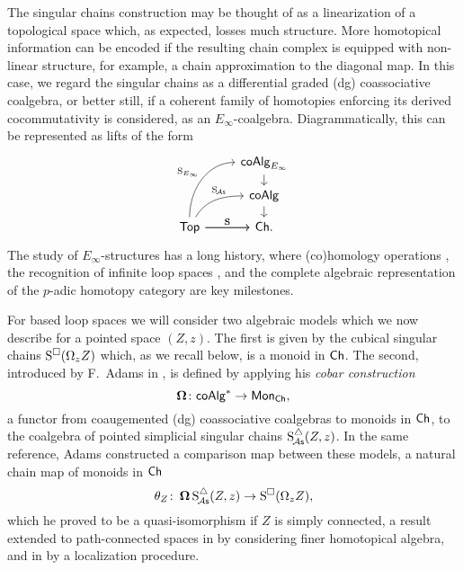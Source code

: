 The singular chains construction may be thought of as a linearization of a topological space which, as expected, losses much structure.
More homotopical information can be encoded if the resulting chain complex is equipped with non-linear structure, for example, a chain approximation to the diagonal map.
In this case, we regard the singular chains as a differential graded (dg) coassociative coalgebra, or better still, if a coherent family of homotopies enforcing its derived cocommutativity is considered, as an $E_\infty$-coalgebra.
Diagrammatically, this can be represented as lifts of the form
\begin{equation}
	\begin{tikzcd}[column sep=normal, row sep=small]
		& \coAlg_{E_\infty} \arrow[d] \\
		& \coAlg \arrow[d] \\
		\Top \arrow[uur, "\Schains_{E_\infty}", out=90, in=180] \arrow[r, "\Schains"]
		\arrow[ur, "\SchainsA", out=60, in=180, near end]
		\arrow[r, "\Schains"]
		& \Ch.
	\end{tikzcd}
\end{equation}
The study of $E_\infty$-structures has a long history, where (co)homology operations \cite{steenrod1962cohomology, may1970general}, the recognition of infinite loop spaces \cite{boardman1973homotopy, may1972geometry}, and the complete algebraic representation of the $p$-adic homotopy category \cite{mandell2001padic} are key milestones.

For based loop spaces we will consider two algebraic models which we now describe for a pointed space $(Z, z)$.
The first is given by the cubical singular chains $\operatorname{S^{\square}}(\Omega_z Z)$ which, as we recall below, is a monoid in $\mathsf{Ch}$.
The second, introduced by F.~Adams in \cite{adams1956cobar}, is defined by applying his \textit{cobar construction}
\[
\operatorname{\mathbf{\Omega}} \colon \mathsf{coAlg}^\ast \to \mathsf{Mon}_{\mathsf{Ch}},
\]
a functor from coaugemented (dg) coassociative coalgebras to monoids in $\mathsf{Ch}$, to the coalgebra of pointed simplicial singular chains $\operatorname{S^{\triangle}_{\!{\mathcal{A}\mathsf{s}}}}(Z,z)$.
In the same reference, Adams constructed a comparison map between these models, a natural chain map of monoids in $\mathsf{Ch}$
\begin{equation} \label{e:adams map}
	\theta_Z \colon \operatorname{\mathbf{\Omega}} \operatorname{S^{\triangle}_{\!{\mathcal{A}\mathsf{s}}}}(Z,z) \to \operatorname{S^{\square}}(\Omega_z Z),
\end{equation}
which he proved to be a quasi-isomorphism if $Z$ is simply connected, a result extended to path-connected spaces in \cite{rivera2018cubical} by considering finer homotopical algebra, and in \cite{hess2010cobar} by a localization procedure.


